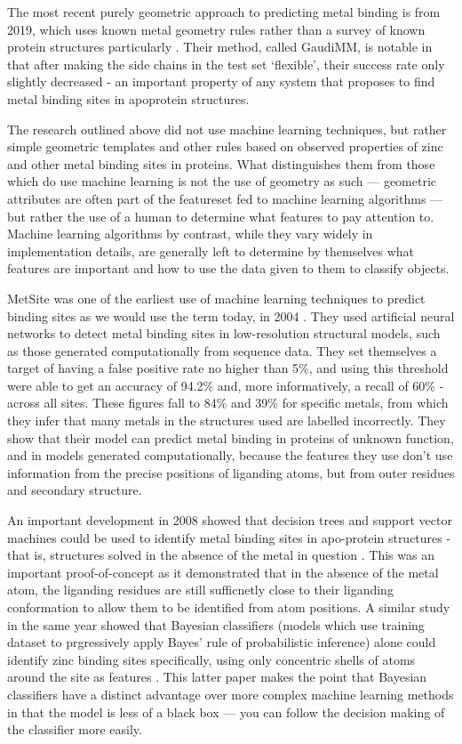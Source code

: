The most recent purely geometric approach to predicting metal binding is from 2019, which uses known metal geometry rules rather than a survey of known protein structures particularly \cite{sciortino2019}. Their method, called GaudiMM, is notable in that after making the side chains in the test set `flexible', their success rate only slightly decreased - an important property of any system that proposes to find metal binding sites in apoprotein structures.

The research outlined above did not use machine learning techniques, but rather simple geometric templates and other rules based on observed properties of zinc and other metal binding sites in proteins. What distinguishes them from those which do use machine learning is not the use of geometry as such --- geometric attributes are often part of the featureset fed to machine learning algorithms --- but rather the use of a human to determine what features to pay attention to. Machine learning algorithms by contrast, while they vary widely in implementation details, are generally left to determine by themselves what features are important and how to use the data given to them to classify objects.


MetSite was one of the earliest use of machine learning techniques to predict binding sites as we would use the term today, in 2004 \cite{sodhi2004predicting}. They used artificial neural networks to detect metal binding sites in low-resolution structural models, such as those generated computationally from sequence data. They set themselves a target of having a false positive rate no higher than 5\%, and using this threshold were able to get an  accuracy of 94.2\% and, more informatively, a recall of 60\% - across all sites. These figures fall to 84\% and 39\% for specific metals, from which they infer that many metals in the structures used are labelled incorrectly. They show that their model can predict metal binding in proteins of unknown function, and in models generated computationally, because the features they use don't use information from the precise positions of liganding atoms, but from outer residues and secondary structure.

An important development in 2008 showed that decision trees and support vector machines could be used to identify metal binding sites in apo-protein structures - that is, structures solved in the absence of the metal in question \cite{babor2008}. This was an important proof-of-concept as it demonstrated that in the absence of the metal atom, the liganding residues are still sufficnetly close to their liganding conformation to allow them to be identified from atom positions. A similar study in the same year showed that Bayesian classifiers (models which use training dataset to prgressively apply Bayes' rule of probabilistic inference) alone could identify zinc binding sites specifically, using only concentric shells of atoms around the site as features \cite{ebert2008}. This latter paper makes the point that Bayesian classifiers have a distinct advantage over more complex machine learning methods in that the model is less of a black box --- you can follow the decision making of the classifier more easily.

